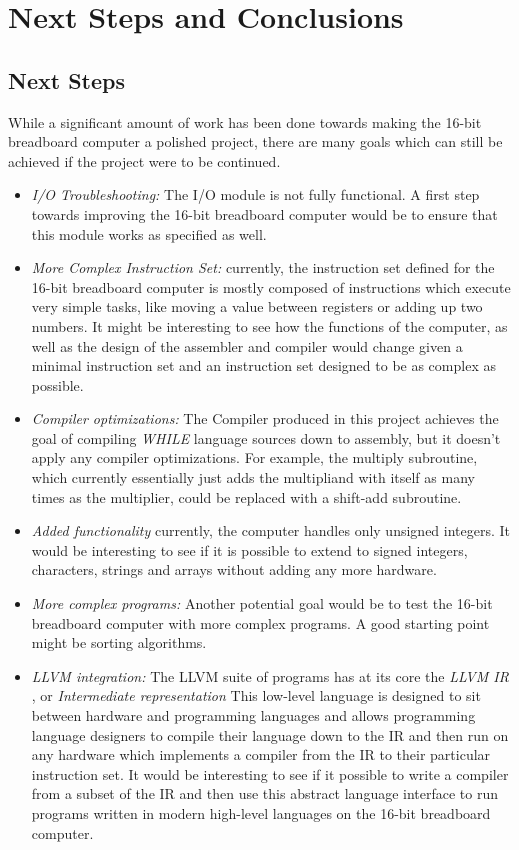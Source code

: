 \chapter{Next Steps and Conclusions}

\section{Next Steps}
While a significant amount of work has been done towards making the 16-bit breadboard
computer a polished project, there are many goals which can still be achieved if the
project were to be continued.
\begin{itemize}
  \item \emph{I/O Troubleshooting:} The I/O module is not fully functional. A first step
  towards improving the 16-bit breadboard computer would be to ensure that this module
  works as specified as well.
  \item \emph{More Complex Instruction Set: } currently, the instruction set defined for the 16-bit
  breadboard computer is mostly composed of instructions which execute very simple tasks, like moving
  a value between registers or adding up two numbers. It might be interesting to see how the
  functions of the computer, as well as the design of the assembler and compiler would change given
  a minimal instruction set and an instruction set designed to be as complex as possible.
  \item \emph{Compiler optimizations: } The Compiler produced in this project  achieves the goal
  of compiling \emph{WHILE} language sources down to assembly, but it doesn't apply any compiler
  optimizations. For example, the multiply subroutine, which currently essentially just adds the
  multipliand with itself as many times as the multiplier, could be replaced with a shift-add
  subroutine.
  \item \emph{Added functionality } currently, the computer handles only unsigned integers. It would be
  interesting to see if it is possible to extend to signed integers, characters, strings and arrays
  without adding any more hardware.
  \item \emph{More complex programs: } Another potential goal would be to test the 16-bit breadboard
  computer with more complex programs. A good starting point might be sorting algorithms.
  \item \emph{LLVM integration: } The LLVM suite of programs has at its core the \emph{LLVM IR}
  \cite{llvm}, or \emph{Intermediate representation} This low-level language is designed to sit between
  hardware and  programming languages and allows programming language designers to compile their
  language down to the IR and then run on any hardware which implements a compiler from the IR to their
  particular instruction set. It would be interesting to see if it possible to write a compiler from
  a subset of the IR and then use this abstract language interface to run programs written in modern
  high-level languages on the 16-bit breadboard computer.
\end{itemize}


